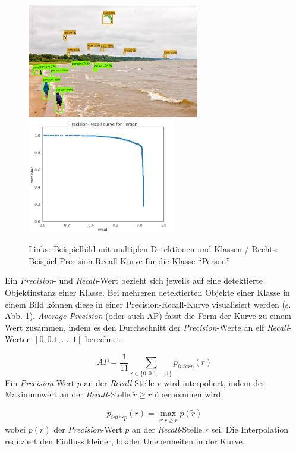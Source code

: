 \begin{figure}[ht]
  \centering
  \includegraphics[height=5cm]{pics/kites.jpg}
  \hspace{.5cm}
  \includegraphics[height=5cm]{pics/precision-recall-kurve.png}
  \caption[Precision-Recall-Kurve]{Links: Beispielbild mit multiplen Detektionen und Klassen\cite[S. 15]{ref:huang} / Rechts: Beispiel Precision-Recall-Kurve für die Klasse "`Person"'\cite{ref:arlen}}
  \label{fig:precision-recall}
\end{figure}
\noindent
Ein \textit{Precision}- und \textit{Recall}-Wert bezieht sich jeweils auf eine detektierte Objektinstanz einer Klasse. Bei mehreren detektierten Objekte einer Klasse in einem Bild können diese in einer Precision-Recall-Kurve visualisiert werden (s. Abb. \ref{fig:precision-recall}). \textit{Average Precision} (oder auch AP) fasst die Form der Kurve zu einem Wert zusammen, indem es den Durchschnitt der \textit{Precision}-Werte an elf \textit{Recall}-Werten $[0, 0.1, \dots, 1]$ berechnet: 

\begin{equation}\label{equation:ap}
  AP = \frac{1}{11} \sum_{r \in \{0, 0.1, \dots, 1\}}  p_{interp}(r)
\end{equation}
\noindent
Ein \textit{Precision}-Wert $p$ an der \textit{Recall}-Stelle $r$ wird interpoliert, indem der Maximumwert an der \textit{Recall}-Stelle $\tilde{r}\ge r$ übernommen wird:

\begin{equation}\label{equation:pinterp}
  p_{interp}(r) = \max_{\tilde{r}:\tilde{r}\ge r} p (\tilde{r})
\end{equation}
\noindent
wobei $p(\tilde{r})$ der \textit{Precision}-Wert $p$ an der \textit{Recall}-Stelle $\tilde{r}$ sei. Die Interpolation reduziert den Einfluss kleiner, lokaler Unebenheiten in der Kurve.\cite{ref:arlen}

